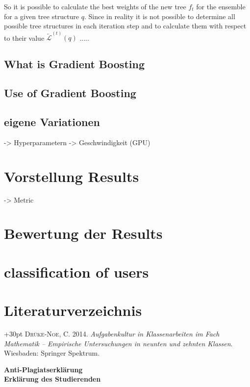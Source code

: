 \documentclass[a4paper,12pt]{scrartcl}
\newcommand{\LL}{\ensuremath{\mathcal{L}}}
\begin{document}
So it is possible to calculate the best weights of the new tree $f_t$ for the ensemble for a given tree structure $q$. Since in reality it is not possible to determine all possible tree structures in each iteration step and to calculate them with respect to their value $\tilde{\LL}^{(t)} (q)$ .....



\subsection{What is Gradient Boosting}

\subsection{Use of Gradient Boosting}

\subsection{eigene Variationen}
-> Hyperparametern
-> Geschwindigkeit (GPU)


\section{Vorstellung Results}
-> Metric

\section{Bewertung der Results}

\section{classification of users}




\newpage
\section{Literaturverzeichnis}

\hangindent+30pt 
\textsc{Drüke-Noe, C.} 2014. \textit{Aufgabenkultur in Klassenarbeiten im Fach Mathematik – Empirische Untersuchungen in neunten und zehnten Klassen}. Wiesbaden:
Springer Spektrum.









\newpage
{}
\vspace*{1cm}
\begin{center}
	\Large \textbf{Anti-Plagiatserklärung}\\
	
	\large \textbf{Erklärung des Studierenden}
\end{center}
\end{document}
